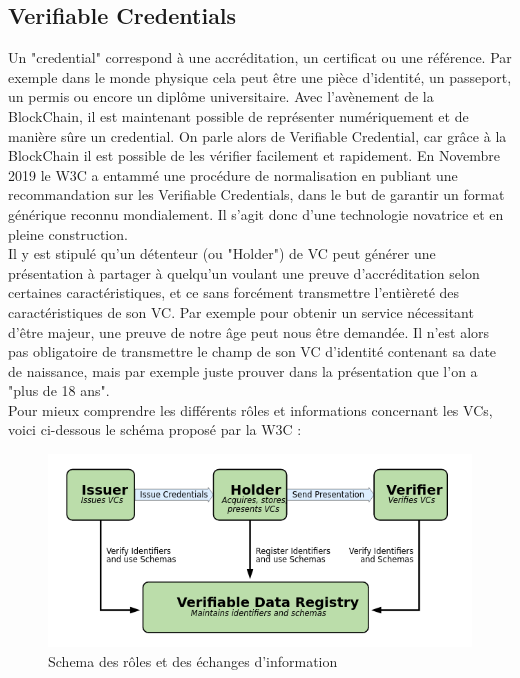 \documentclass[12pt, openany]{report}
\begin{document}
\subsection{Verifiable Credentials}
\noindent 
\begin{flushleft}
Un "credential" correspond à une accréditation, un certificat ou une référence. Par exemple dans le monde physique cela peut être une pièce d'identité, un passeport, un permis ou encore un diplôme universitaire. Avec l'avènement de la BlockChain, il est maintenant possible de représenter numériquement et de manière sûre un credential. On parle alors de Verifiable Credential, car grâce à la BlockChain il est possible de les vérifier facilement et rapidement. En Novembre 2019 le W3C a entammé une procédure de normalisation en publiant une recommandation sur les Verifiable Credentials, dans le but de garantir un format générique reconnu mondialement. Il s'agit donc d'une technologie novatrice et en pleine construction.\\
Il y est stipulé qu'un détenteur (ou "Holder") de VC peut générer une présentation à partager à quelqu'un voulant une preuve d'accréditation selon certaines caractéristiques, et ce sans forcément transmettre l'entièreté des caractéristiques de son VC. Par exemple pour obtenir un service nécessitant d'être majeur, une preuve de notre âge peut nous être demandée. Il n'est alors pas obligatoire de transmettre le champ de son VC d'identité contenant sa date de naissance, mais par exemple juste prouver dans la présentation que l'on a "plus de 18 ans".\\

Pour mieux comprendre les différents rôles et informations concernant les VCs, voici ci-dessous le schéma proposé par la W3C :\\
\begin{figure}[h]
\includegraphics[scale=0.5]{vc.png}
\centering
\caption{Schema des rôles et des échanges d'information}
\end{figure}


\end{flushleft}
\end{document}
